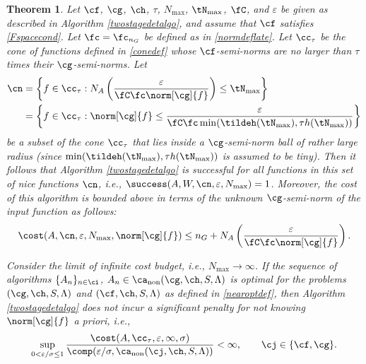 \documentclass[]{elsarticle}
\DeclareMathOperator{\fix}{non}
\newtheorem{theorem}{Theorem}
\theoremstyle{definition}
\theoremstyle{remark}
\begin{document}
\begin{theorem}  \label{TwoStageDetermThm}  Let  $\cf$, $\cg$, $\ch$,  $\tau$, $N_{\max}$, $\tN_{\max}$, $\fC$, and $\varepsilon$ be given as described in Algorithm \ref{twostagedetalgo}, and assume that $\cf$ satisfies \eqref{Fspacecond}.  Let $\fc=\fc_{n_G}$ be defined as in \eqref{normdeflate}.
Let $\cc_\tau$ be the cone of functions defined in \eqref{conedef} whose $\cf$-semi-norms are no larger than $\tau$ times their $\cg$-semi-norms.  Let
\begin{align} 
\nonumber
\cn &= \left \{ f \in \cc_\tau : N_{A}\left(\frac{\varepsilon}{\fC \fc \norm[\cg]{f}} \right) \le \tN_{\max} \right\} \\
\label{nicefdef}
&= \left \{ f \in \cc_\tau : \norm[\cg]{f} \le \frac{\varepsilon}{\fC \fc \min(\tildeh(\tN_{\max}),\tau h(\tN_{\max}))} \right\}
\end{align}
be a subset of the cone $\cc_\tau$ that lies inside a $\cg$-semi-norm ball of rather large radius (since $\min(\tildeh(\tN_{\max}),\tau h(\tN_{\max}))$ is assumed to be tiny).  Then it follows that Algorithm \ref{twostagedetalgo} is successful for all functions in this set of \emph{nice} functions $\cn$,  i.e.,  $\success(A,W,\cn,\varepsilon,N_{\max}) = 1$.  Moreover, the cost of this algorithm is bounded above in terms of the unknown $\cg$-semi-norm of the input function as follows:
\begin{equation} \label{auto2stagedetcost}
\cost(A,\cn,\varepsilon,N_{\max},\norm[\cg]{f})
\le n_G+ N_{A}\left(\frac{\varepsilon}{\fC \fc \norm[\cg]{f}} \right).
\end{equation}

Consider the limit of infinite cost budget, i.e., $N_{\max} \to \infty$.  If the sequence of algorithms $\{A_n\}_{n \in \ci}$, $A_n \in\ca_{\fix}(\cg,\ch,S,\Lambda)$  is optimal for the problems $(\cg,\ch,S,\Lambda)$ and $(\cf,\ch,S,\Lambda)$ as defined in \eqref{nearoptdef}, then Algorithm \ref{twostagedetalgo} does not incur a significant penalty for not knowing $\norm[\cg]{f}$ a priori, i.e.,
\begin{equation} \label{penalty}
\sup_{0 < \varepsilon/\sigma \le 1} \frac{\cost(A,\cc_{\tau},\varepsilon,\infty,\sigma)} {\comp(\varepsilon/\sigma,\ca_{\fix}(\cj,\ch,S,\Lambda))} <\infty, \qquad \cj \in \{\cf,\cg\}.
\end{equation}
\end{theorem}
\end{document}
